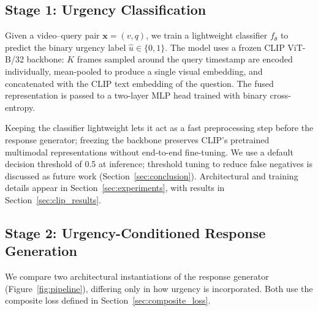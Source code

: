 \documentclass{article}
\begin{document}
\subsection{Stage 1: Urgency Classification}
Given a video--query pair $\mathbf{x} = (v, q)$, we train a lightweight classifier $f_\theta$ to predict the binary urgency label $\hat{u} \in \{0,1\}$. The model uses a frozen CLIP ViT-B/32 backbone: $K$ frames sampled around the query timestamp are encoded individually, mean-pooled to produce a single visual embedding, and concatenated with the CLIP text embedding of the question. The fused representation is passed to a two-layer MLP head trained with binary cross-entropy.

Keeping the classifier lightweight lets it act as a fast preprocessing step before the response generator; freezing the backbone preserves CLIP's pretrained multimodal representations without end-to-end fine-tuning. We use a default decision threshold of 0.5 at inference; threshold tuning to reduce false negatives is discussed as future work (Section~\ref{sec:conclusion}). Architectural and training details appear in Section~\ref{sec:experiments}, with results in Section~\ref{sec:clip_results}.

\subsection{Stage 2: Urgency-Conditioned Response Generation}
We compare two architectural instantiations of the response generator (Figure~\ref{fig:pipeline}), differing only in how urgency is incorporated. Both use the composite loss defined in Section~\ref{sec:composite_loss}.
\end{document}
